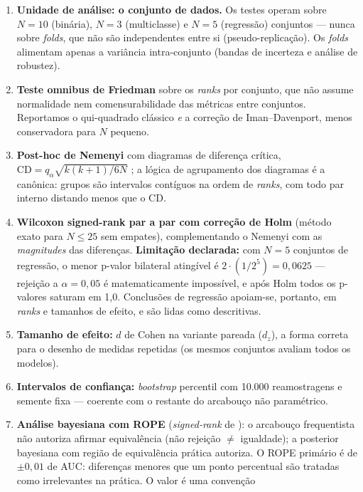 \begin{enumerate}
  \item \textbf{Unidade de análise: o conjunto de dados.} Os testes operam
    sobre $N=10$ (binária), $N=3$ (multiclasse) e $N=5$ (regressão)
    conjuntos --- nunca sobre \emph{folds}, que não são independentes entre
    si (pseudo-replicação). Os \emph{folds} alimentam apenas a variância
    intra-conjunto (bandas de incerteza e análise de robustez).
  \item \textbf{Teste omnibus de Friedman} sobre os \emph{ranks} por
    conjunto, que não assume normalidade nem comensurabilidade das métricas
    entre conjuntos. Reportamos o qui-quadrado clássico \emph{e} a correção
    de Iman--Davenport, menos conservadora para $N$ pequeno.
  \item \textbf{Post-hoc de Nemenyi} com diagramas de diferença crítica,
    $\mathrm{CD} = q_\alpha \sqrt{k(k+1)/6N}$ \citep{demsar2006}; a lógica
    de agrupamento dos diagramas é a canônica: grupos são intervalos
    contíguos na ordem de \emph{ranks}, com todo par
    interno distando menos que o CD.
  \item \textbf{Wilcoxon signed-rank par a par com correção de Holm}
    (método exato para $N \le 25$ sem empates), complementando o Nemenyi
    com as \emph{magnitudes} das diferenças. \textbf{Limitação declarada:}
    com $N=5$ conjuntos de regressão, o menor p-valor bilateral atingível é
    $2 \cdot (1/2^5) = 0{,}0625$ --- rejeição a $\alpha = 0{,}05$ é
    matematicamente impossível, e após Holm todos os p-valores saturam em
    1,0. Conclusões de regressão apoiam-se,
    portanto, em \emph{ranks} e tamanhos de efeito, e são lidas como
    descritivas.
  \item \textbf{Tamanho de efeito:} $d$ de Cohen na variante pareada
    ($d_z$), a forma correta para o desenho de medidas repetidas (os mesmos
    conjuntos avaliam todos os modelos).
  \item \textbf{Intervalos de confiança:} \emph{bootstrap} percentil com
    10.000 reamostragens e semente fixa --- coerente com o restante do
    arcabouço não paramétrico.
  \item \textbf{Análise bayesiana com ROPE} (\emph{signed-rank} de
    \citealp{benavoli2017}): o arcabouço frequentista não autoriza afirmar
    equivalência (não rejeição $\neq$ igualdade); a posterior bayesiana com
    região de equivalência prática autoriza. O ROPE primário é de
    $\pm 0{,}01$ de AUC: diferenças menores que um ponto percentual são
    tratadas como irrelevantes na prática. O valor é uma convenção

\end{enumerate}
